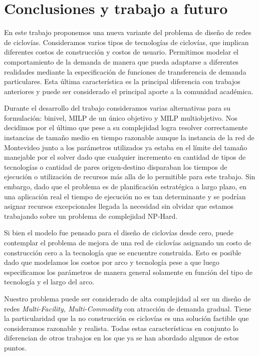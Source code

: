\chapter{Conclusiones y trabajo a futuro}

En este trabajo proponemos una nueva variante del problema de diseño de redes de ciclovías. Consideramos varios tipos de tecnologías de ciclovías, que implican diferentes costos de construcción y costos de usuario. Permitimos modelar el comportamiento de la demanda de manera que pueda adaptarse a diferentes realidades mediante la especificación de funciones de transferencia de demanda particulares. Esta última característica es la principal diferencia con trabajos anteriores y puede ser considerado el principal aporte a la comunidad académica.

Durante el desarrollo del trabajo consideramos varias alternativas para su formulación: binivel, MILP de un único objetivo y MILP multiobjetivo. Nos decidimos por el último que pese a su complejidad logra resolver correctamente instancias de tamaño medio en tiempo razonable aunque la instancia de la red de Montevideo junto a los parámetros utilizados ya estaba en el límite del tamaño manejable por el solver dado que cualquier incremento en cantidad de tipos de tecnologías o cantidad de pares origen-destino disparaban los tiempos de ejecución o utilización de recursos más alla de lo permitible para este trabajo. Sin embargo, dado que el problema es de planificación estratégica a largo plazo, en una aplicación real el tiempo de ejecución no es tan determinante y se podrían asignar recursos excepcionales llegada la necesidad sin olvidar que estamos trabajando sobre un problema de complejidad NP-Hard.

Si bien el modelo fue pensado para el diseño de ciclovías desde cero, puede contemplar el problema de mejora de una red de ciclovías asignando un costo de construcción cero a la tecnología que se encuentre construida. Esto es posible dado que modelamos los costos por arco y tecnología pese a que luego especificamos los parámetros de manera general solamente en función del tipo de tecnología y el largo del arco.

Nuestro problema puede ser considerado de alta complejidad al ser un diseño de redes {\it Multi-Facility, Multi-Commodity} con atracción de demanda gradual. Tiene la particularidad que la no construcción es ciclovías es una solución factible que consideramos razonable y realista. Todas estas características en conjunto lo diferencian de otros trabajos en los que ya se han abordado algunos de estos puntos.

